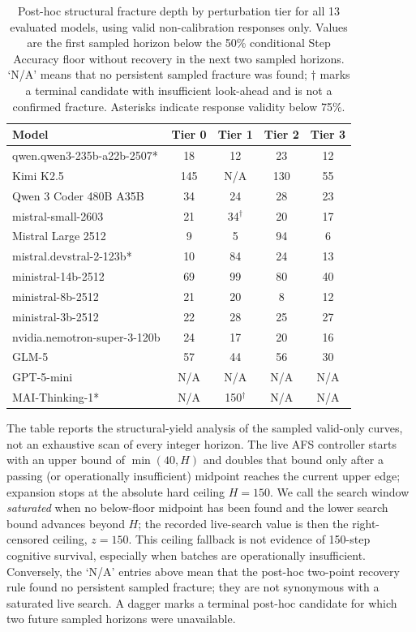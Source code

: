 \documentclass{article}
\begin{document}
\begin{table}[H]
\centering
\caption{Post-hoc structural fracture depth by perturbation tier for all 13 evaluated models, using valid non-calibration responses only. Values are the first sampled horizon below the 50\% conditional Step Accuracy floor without recovery in the next two sampled horizons. `N/A' means that no persistent sampled fracture was found; $\dagger$ marks a terminal candidate with insufficient look-ahead and is not a confirmed fracture. Asterisks indicate response validity below 75\%.}
\label{tab:fracture_full}
\scriptsize
\begin{tabular}{lcccc}
\toprule
\textbf{Model} & \textbf{Tier 0} & \textbf{Tier 1} & \textbf{Tier 2} & \textbf{Tier 3} \\
\midrule
qwen.qwen3-235b-a22b-2507* & 18 & 12 & 23 & 12 \\
Kimi K2.5 & 145 & N/A & 130 & 55 \\
Qwen 3 Coder 480B A35B & 34 & 24 & 28 & 23 \\
mistral-small-2603 & 21 & 34$^\dagger$ & 20 & 17 \\
Mistral Large 2512 & 9 & 5 & 94 & 6 \\
mistral.devstral-2-123b* & 10 & 84 & 24 & 13 \\
ministral-14b-2512 & 69 & 99 & 80 & 40 \\
ministral-8b-2512 & 21 & 20 & 8 & 12 \\
ministral-3b-2512 & 22 & 28 & 25 & 27 \\
nvidia.nemotron-super-3-120b & 24 & 17 & 20 & 16 \\
GLM-5 & 57 & 44 & 56 & 30 \\
GPT-5-mini & N/A & N/A & N/A & N/A \\
MAI-Thinking-1* & N/A & 150$^\dagger$ & N/A & N/A \\
\bottomrule
\end{tabular}
\end{table}

The table reports the structural-yield analysis of the sampled valid-only curves, not an exhaustive scan of every integer horizon. The live AFS controller starts with an upper bound of $\min(40,H)$ and doubles that bound only after a passing (or operationally insufficient) midpoint reaches the current upper edge; expansion stops at the absolute hard ceiling $H=150$. We call the search window \emph{saturated} when no below-floor midpoint has been found and the lower search bound advances beyond $H$; the recorded live-search value is then the right-censored ceiling, $z=150$. This ceiling fallback is not evidence of 150-step cognitive survival, especially when batches are operationally insufficient. Conversely, the `N/A' entries above mean that the post-hoc two-point recovery rule found no persistent sampled fracture; they are not synonymous with a saturated live search. A dagger marks a terminal post-hoc candidate for which two future sampled horizons were unavailable.
\end{document}
